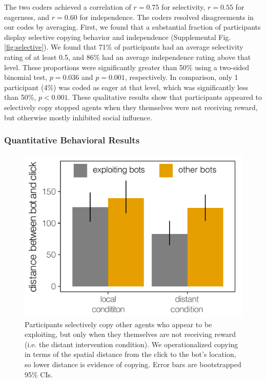 \documentclass[12pt,letterpaper]{article}
\begin{document}
The two coders achieved a correlation of $r = 0.75$ for selectivity, $r = 0.55$ for eagerness, and $r = 0.60$ for independence. The coders resolved disagreements in our codes by averaging. 
First, we found that a substantial fraction of participants display selective copying behavior and independence (Supplemental Fig. \ref{fig:selective}). 
We found that 71\% of participants had an average selectivity rating of at least 0.5, and 86\% had an average independence rating above that level. 
These proportions were significantly greater than 50\% using a two-sided binomial test, $p = 0.036$ and $p = 0.001$, respectively.  
In comparison, only 1 participant (4\%) was coded as eager at that level, which was significantly less than 50\%, $p < 0.001$.
These qualitative results show that participants appeared to selectively copy stopped agents when they themselves were not receiving reward, but otherwise mostly inhibited social influence.


\subsubsection{Quantitative Behavioral Results}

\begin{figure}[th!]
    \centering
    \includegraphics[width=0.8\linewidth]{figures/proximity.pdf}
    \vspace{-1em}
    \caption{Participants selectively copy other agents who appear to be exploiting, but only when they themselves are not receiving reward (i.e. the distant intervention condition). We operationalized copying in terms of the spatial distance from the click to the bot's location, so lower distance is evidence of copying. Error bars are bootstrapped 95\% CIs.} %
    \label{fig:proximity}
\end{figure}
\end{document}
